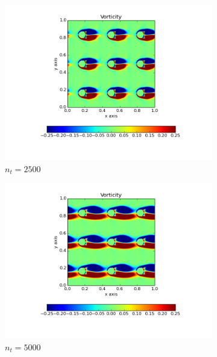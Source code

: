 \documentclass[10pt, a4paper]{article}
\begin{document}
\begin{figure}[htb!]
\centering
\begin{subfigure}{.5\textwidth}
  \centering
  \includegraphics[width=1.1\linewidth, clip=true, trim=1cm 1cm 1cm 1cm]{q1_0001}
  \caption{$n_t = 2500$}
  \label{fig:sub1}
\end{subfigure}%
\begin{subfigure}{.5\textwidth}
  \centering
  \includegraphics[width=1.1\linewidth, clip=true, trim=1cm 1cm 1cm 1cm]{q1_0002}
  \caption{$n_t = 5000$}
  \label{fig:sub2}
\end{subfigure}
\newline
\begin{subfigure}{.5\textwidth}
  \centering

\end{subfigure}
\end{figure}
\end{document}
